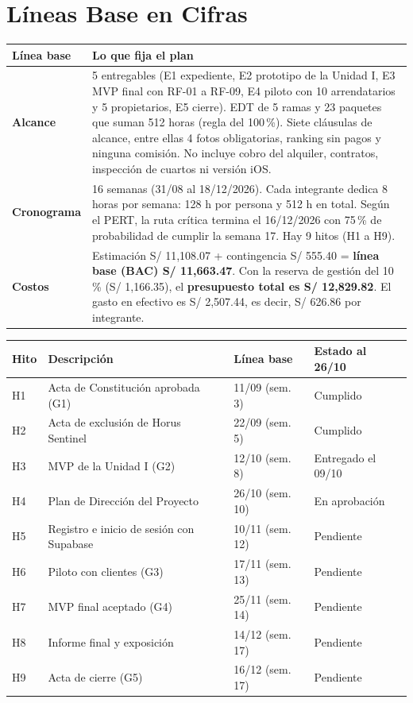 \documentclass[11pt,a4paper]{article}
\begin{document}
\section{Líneas Base en Cifras}
{\small
{}
\noindent\begin{tabularx}{\textwidth}{@{}P{2.4cm} L@{}}
\toprule
{}
\textbf{Línea base} & \textbf{Lo que fija el plan} \\
\midrule
\textbf{Alcance} & 5 entregables (E1 expediente, E2 prototipo de la Unidad I, E3 MVP final con RF-01 a RF-09, E4 piloto con 10 arrendatarios y 5 propietarios, E5 cierre). EDT de 5 ramas y 23 paquetes que suman 512 horas (regla del 100\,\%). Siete cláusulas de alcance, entre ellas 4 fotos obligatorias, ranking sin pagos y ninguna comisión. No incluye cobro del alquiler, contratos, inspección de cuartos ni versión iOS. \\
\textbf{Cronograma} & 16 semanas (31/08 al 18/12/2026). Cada integrante dedica 8 horas por semana: 128 h por persona y 512 h en total. Según el PERT, la ruta crítica termina el 16/12/2026 con 75\,\% de probabilidad de cumplir la semana 17. Hay 9 hitos (H1 a H9). \\
\textbf{Costos} & Estimación S/ 11,108.07 + contingencia S/ 555.40 = \textbf{línea base (BAC) S/ 11,663.47}. Con la reserva de gestión del 10\,\% (S/ 1,166.35), el \textbf{presupuesto total es S/ 12,829.82}. El gasto en efectivo es S/ 2,507.44, es decir, S/ 626.86 por integrante. \\
\bottomrule
\end{tabularx}
}

\vspace{0.15cm}
{\small
{}
\noindent\begin{tabularx}{\textwidth}{@{}C{0.8cm} L C{2.9cm} C{3.0cm}@{}}
\toprule
{}
\textbf{Hito} & \textbf{Descripción} & \textbf{Línea base} & \textbf{Estado al 26/10} \\
\midrule
H1 & Acta de Constitución aprobada (G1) & 11/09 (sem. 3) & Cumplido \\
H2 & Acta de exclusión de Horus Sentinel & 22/09 (sem. 5) & Cumplido \\
H3 & MVP de la Unidad I (G2) & 12/10 (sem. 8) & Entregado el 09/10 \\
H4 & Plan de Dirección del Proyecto & 26/10 (sem. 10) & En aprobación \\
H5 & Registro e inicio de sesión con Supabase & 10/11 (sem. 12) & Pendiente \\
H6 & Piloto con clientes (G3) & 17/11 (sem. 13) & Pendiente \\
H7 & MVP final aceptado (G4) & 25/11 (sem. 14) & Pendiente \\
H8 & Informe final y exposición & 14/12 (sem. 17) & Pendiente \\
H9 & Acta de cierre (G5) & 16/12 (sem. 17) & Pendiente \\
\bottomrule
\end{tabularx}
}
\end{document}
